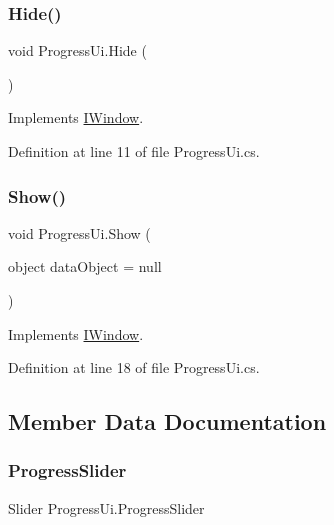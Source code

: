 \subsubsection{\texorpdfstring{Hide()}{Hide()}}
{\footnotesize\ttfamily void Progress\+Ui.\+Hide (\begin{DoxyParamCaption}{ }\end{DoxyParamCaption})}



Implements \mbox{\hyperlink{interface_i_window_a829d3aa9bcf80a75ba84968399492378}{I\+Window}}.



Definition at line 11 of file Progress\+Ui.\+cs.

\mbox{\label{class_progress_ui_a59904d8df7c6b696637d26648a26a0b3}} 
\subsubsection{\texorpdfstring{Show()}{Show()}}
{\footnotesize\ttfamily void Progress\+Ui.\+Show (\begin{DoxyParamCaption}\item[{object}]{data\+Object = {\ttfamily null} }\end{DoxyParamCaption})}



Implements \mbox{\hyperlink{interface_i_window_aba12a3c53948d87aef07aed93b225aa9}{I\+Window}}.



Definition at line 18 of file Progress\+Ui.\+cs.



\subsection{Member Data Documentation}
\mbox{\label{class_progress_ui_a4ddaef0f03a85ae79966ca78243da48f}} 
\subsubsection{\texorpdfstring{ProgressSlider}{ProgressSlider}}
{\footnotesize\ttfamily Slider Progress\+Ui.\+Progress\+Slider}



